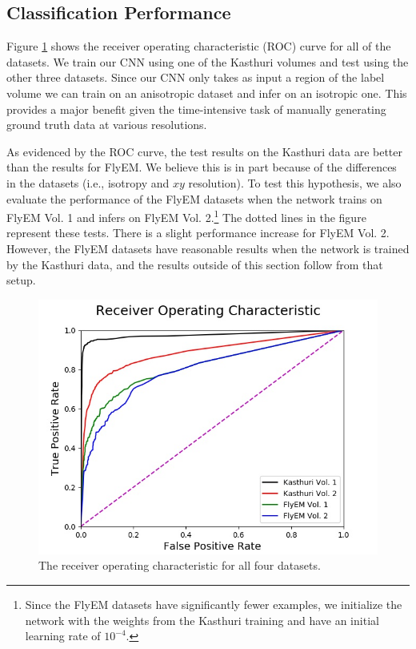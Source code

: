 \subsection{Classification Performance}

Figure \ref{fig:receiver-operating-characteristic} shows the receiver operating characteristic (ROC) curve for all of the datasets. 
We train our CNN using one of the Kasthuri volumes and test using the other three datasets.
Since our CNN only takes as input a region of the label volume we can train on an anisotropic dataset and infer on an isotropic one. 
This provides a major benefit given the time-intensive task of manually generating ground truth data at various resolutions.

As evidenced by the ROC curve, the test results on the Kasthuri data are better than the results for FlyEM.
We believe this is in part because of the differences in the datasets (i.e., isotropy and $xy$ resolution). 
To test this hypothesis, we also evaluate the performance of the FlyEM datasets when the network trains on FlyEM Vol. 1 and infers on FlyEM Vol. 2.\footnote{Since the FlyEM datasets have significantly fewer examples, we initialize the network with the weights from the Kasthuri training and have an initial learning rate of $10^{-4}$.}
The dotted lines in the figure represent these tests. 
There is a slight performance increase for FlyEM Vol. 2.
However, the FlyEM datasets have reasonable results when the network is trained by the Kasthuri data, and the results outside of this section follow from that setup.  

\begin{figure}
	\centering
	\includegraphics[width=0.95\linewidth]{./figures/receiver-operating-characteristic.jpg}
	\caption{The receiver operating characteristic for all four datasets.}
	\label{fig:receiver-operating-characteristic}
\end{figure}	
	
